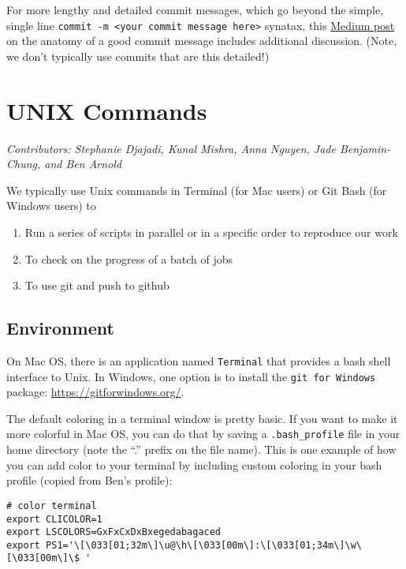 \documentclass[
]{book}
\providecommand{\tightlist}{%
  \setlength{\itemsep}{0pt}\setlength{\parskip}{0pt}}
\begin{document}
For more lengthy and detailed commit messages, which go beyond the simple, single line \texttt{commit\ -m\ \textless{}your\ commit\ message\ here\textgreater{}} synatax, this \href{https://medium.com/@andrewhowdencom/anatomy-of-a-good-commit-message-acd9c4490437}{Medium post} on the anatomy of a good commit message includes additional discussion. (Note, we don't typically use commits that are this detailed!)

\hypertarget{unix}{%
\chapter{UNIX Commands}\label{unix}}

\emph{Contributors: Stephanie Djajadi, Kunal Mishra, Anna Nguyen, Jade Benjamin-Chung, and Ben Arnold}

We typically use Unix commands in Terminal (for Mac users) or Git Bash (for Windows users) to

\begin{enumerate}
\def\labelenumi{\arabic{enumi}.}
\tightlist
\item
  Run a series of scripts in parallel or in a specific order to reproduce our work
\item
  To check on the progress of a batch of jobs
\item
  To use git and push to github
\end{enumerate}

\hypertarget{environment}{%
\section{Environment}\label{environment}}

On Mac OS, there is an application named \texttt{Terminal} that provides a bash shell interface to Unix. In Windows, one option is to install the \texttt{git\ for\ Windows} package: \url{https://gitforwindows.org/}.

The default coloring in a terminal window is pretty basic. If you want to make it more colorful in Mac OS, you can do that by saving a \texttt{.bash\_profile} file in your home directory (note the ``.'' prefix on the file name). This is one example of how you can add color to your terminal by including custom coloring in your bash profile (copied from Ben's profile):

\begin{verbatim}
# color terminal
export CLICOLOR=1
export LSCOLORS=GxFxCxDxBxegedabagaced
export PS1='\[\033[01;32m\]\u@\h\[\033[00m\]:\[\033[01;34m\]\w\[\033[00m\]\$ '
\end{verbatim}
\end{document}
